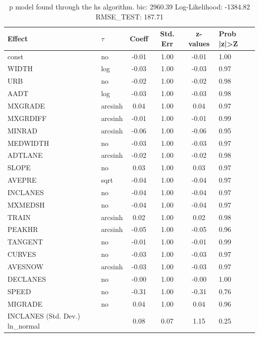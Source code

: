 \begin{table}
	\caption{p model found through the hs algorithm. bic: 2960.39 Log-Likelihood: -1384.82 RMSE_TEST: 187.71}
	\begin{center}
		\begin{tabular}{|l|l|c|c|c|l|}
			\hline
			Effect & $\tau$ & Coeff & Std. Err & z-values & Prob |z|>Z \\
			\hline
			const & no & -0.01 & 1.00 & -0.01 & 1.00 \\
			\hline
			WIDTH & log & -0.03 & 1.00 & -0.03 & 0.97 \\
			\hline
			URB & no & -0.02 & 1.00 & -0.02 & 0.98 \\
			\hline
			AADT & log & -0.03 & 1.00 & -0.03 & 0.98 \\
			\hline
			MXGRADE & arcsinh & 0.04 & 1.00 & 0.04 & 0.97 \\
			\hline
			MXGRDIFF & arcsinh & -0.01 & 1.00 & -0.01 & 0.99 \\
			\hline
			MINRAD & arcsinh & -0.06 & 1.00 & -0.06 & 0.95 \\
			\hline
			MEDWIDTH & no & -0.03 & 1.00 & -0.03 & 0.97 \\
			\hline
			ADTLANE & arcsinh & -0.02 & 1.00 & -0.02 & 0.98 \\
			\hline
			SLOPE & no & 0.03 & 1.00 & 0.03 & 0.97 \\
			\hline
			AVEPRE & sqrt & -0.04 & 1.00 & -0.04 & 0.97 \\
			\hline
			INCLANES & no & -0.04 & 1.00 & -0.04 & 0.97 \\
			\hline
			MXMEDSH & no & -0.04 & 1.00 & -0.04 & 0.97 \\
			\hline
			TRAIN & arcsinh & 0.02 & 1.00 & 0.02 & 0.98 \\
			\hline
			PEAKHR & arcsinh & -0.05 & 1.00 & -0.05 & 0.96 \\
			\hline
			TANGENT & no & -0.01 & 1.00 & -0.01 & 0.99 \\
			\hline
			CURVES & no & -0.03 & 1.00 & -0.03 & 0.97 \\
			\hline
			AVESNOW & arcsinh & -0.03 & 1.00 & -0.03 & 0.97 \\
			\hline
			DECLANES & no & -0.00 & 1.00 & -0.00 & 1.00 \\
			\hline
			SPEED & no & -0.31 & 1.00 & -0.31 & 0.76 \\
			\hline
			MIGRADE & no & 0.04 & 1.00 & 0.04 & 0.96 \\
			\hline
			INCLANES (Std. Dev.) ln_normal &  & 0.08 & 0.07 & 1.15 & 0.25 \\

\end{tabular}
\end{center}
\end{table}
